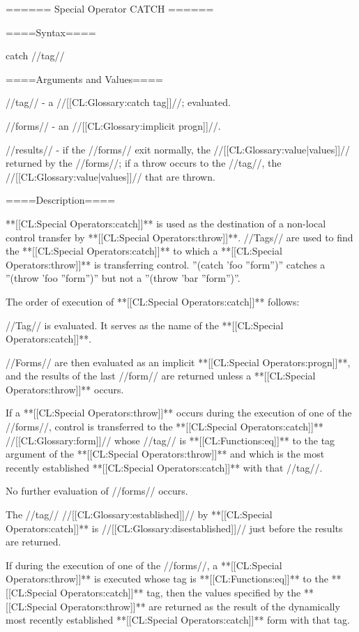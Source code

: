 ====== Special Operator CATCH ======

====Syntax====

\DefspecWithValues catch {//tag// } {}

====Arguments and Values====

//tag// - a //[[CL:Glossary:catch tag]]//; evaluated.

//forms// - an //[[CL:Glossary:implicit progn]]//.

//results// - if the //forms// exit normally, the //[[CL:Glossary:value|values]]// returned by the //forms//; if a throw occurs to the //tag//, the //[[CL:Glossary:value|values]]// that are thrown.

====Description====

**[[CL:Special Operators:catch]]** is used as the destination of a non-local control transfer by **[[CL:Special Operators:throw]]**. //Tags// are used to find the **[[CL:Special Operators:catch]]** to which a **[[CL:Special Operators:throw]]** is transferring control. ''(catch 'foo ''form'')'' catches a ''(throw 'foo ''form'')'' but not a ''(throw 'bar ''form'')''.

The order of execution of **[[CL:Special Operators:catch]]** follows:

\beginlist {} //Tag// is evaluated. It serves as the name of the **[[CL:Special Operators:catch]]**.

 //Forms// are then evaluated as an implicit **[[CL:Special Operators:progn]]**, and the results of the last //form// are returned unless a **[[CL:Special Operators:throw]]** occurs.

 If a **[[CL:Special Operators:throw]]** occurs during the execution of one of the //forms//, control is transferred to the **[[CL:Special Operators:catch]]** //[[CL:Glossary:form]]// whose //tag// is **[[CL:Functions:eq]]** to the tag argument of the **[[CL:Special Operators:throw]]** and which is the most recently established **[[CL:Special Operators:catch]]** with that //tag//.

No further evaluation of //forms// occurs.

 The //tag// //[[CL:Glossary:established]]// by **[[CL:Special Operators:catch]]** is //[[CL:Glossary:disestablished]]// just before the results are returned.

\endlist

If during the execution of one of the //forms//, a **[[CL:Special Operators:throw]]** is executed whose tag is **[[CL:Functions:eq]]** to the **[[CL:Special Operators:catch]]** tag, then the values specified by the **[[CL:Special Operators:throw]]** are returned as the result of the dynamically most recently established **[[CL:Special Operators:catch]]** form with that tag.

